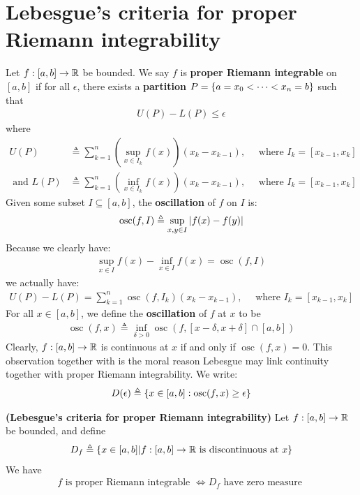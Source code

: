 \documentclass{report}
\begin{document}
\section{Lebesgue's criteria for proper Riemann integrability} 
Let $f:[a,b]\rightarrow \mathbb{R}$ be bounded. We say $f$ is \textbf{proper Riemann integrable} on $[a,b]$ if for all $\epsilon $, there exists a \textbf{partition} $P=\left\{ a=x_0 < \cdots < x_n = b \right\}$ such that 
\begin{align*}
U(P)- L(P) \leq \epsilon   
\end{align*}
where 
\begin{align*}
  U(P)&\triangleq \sum_{k=1}^n \left(\sup_{x \in I_k} f(x) \right) \left(x_k- x_{k-1} \right),\quad \text{ where }I_k=[x_{k-1},x_k]\\
  \text{ and }L(P)&\triangleq \sum_{k=1}^n \left(\inf_{x \in I_k}f(x) \right) \left(x_k- x_{k-1} \right),\quad \text{ where }I_k= [x_{k-1},x_k]
\end{align*}
Given some subset $I \subseteq [a,b]$, the \textbf{oscillation} of $f$ on $I$ is:  
\begin{align*}
\operatorname{osc}(f,I)\triangleq \sup_{x,y\in I} \left|f(x)-f(y)\right|
\end{align*}
Because we clearly have: 
\begin{align*}
\sup_{x \in I}f(x)  - \inf_{x\in I}f(x)= \operatorname{osc}(f,I)
\end{align*}
we actually have:  
\begin{align}
\label{EQuplp}
U(P)-L(P)=  \sum_{k=1}^n \operatorname{osc}(f,I_k) (x_k-x_{k-1}),\quad \text{ where }I_k= [x_{k-1},x_k] 
\end{align}
For all $x\in [a,b]$, we define the \textbf{oscillation} of $f$ at $x$ to be    
\begin{align*}
\operatorname{osc} (f,x) \triangleq \inf_{\delta> 0} \operatorname{osc}\left(f, [x-\delta,x+\delta] \cap [a,b]  \right)
\end{align*}
Clearly, $f:[a,b]\rightarrow \mathbb{R}$ is continuous at $x$ if and only if $\operatorname{osc}(f,x)=0$. This observation together with  is the moral reason Lebesgue may link continuity together with proper Riemann integrability. We write:  
\begin{align*}
D(\epsilon )\triangleq \left\{ x \in [a,b]:\operatorname{osc}(f,x)\geq \epsilon  \right\}
\end{align*}
\begin{theorem}
\label{THLcfpRi}
\textbf{(Lebesgue's criteria for proper Riemann integrability)} Let $f:[a,b]\rightarrow \mathbb{R}$ be bounded, and define
\begin{align*}
D_f \triangleq \left\{ x \in [a,b]|f:[a,b]\rightarrow \mathbb{R}\text{ is discontinuous at }x \right\}
\end{align*}
We have 
\begin{align*}
f\text{ is proper Riemann integrable }\iff D_f\text{ have zero measure }
\end{align*}
\end{theorem}
\end{document}
